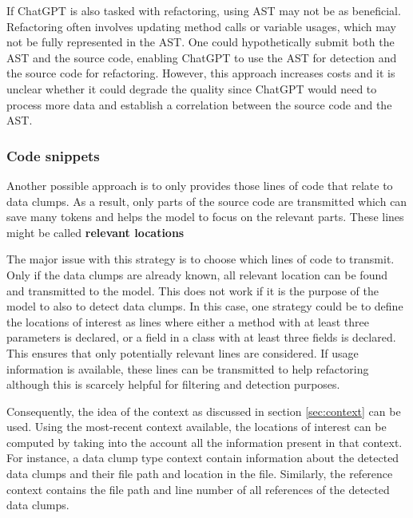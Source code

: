 If ChatGPT is also tasked with refactoring, using \ac{AST} may not be as beneficial. Refactoring often involves updating method calls or variable usages, which may not be fully represented in the \ac{AST}. One could hypothetically submit both the \ac{AST} and the source code, enabling ChatGPT to use the \ac{AST} for detection and the source code for refactoring. However, this approach increases costs and it is unclear whether it could degrade the quality since ChatGPT would need to process more data and establish a correlation between the source code and the \ac{AST}.



\subsubsection{Code snippets}\label{sec:code_snippets}


Another possible approach is to only provides those lines of code that relate to data clumps. As a result, only parts of the source code are transmitted which can save many tokens and helps the model to focus on the relevant parts. These lines might be called \textbf{relevant locations}



The major issue with this strategy is to choose which lines of code to transmit. Only if the data clumps are already known, all relevant location can be found and transmitted to the model. This does not work if it is the purpose of the model to also to detect data clumps. In this case, one strategy could be to define the locations of interest as lines where either a method with at least three parameters is declared, or a field in a class with at least three fields is declared. This ensures that only potentially relevant lines are considered. If usage information is available, these lines can be transmitted to help refactoring although this is scarcely helpful for filtering and detection purposes. 

Consequently, the idea of the context as discussed in section \ref{sec:context} can be used. Using the most-recent context available, the locations of interest can be computed by taking into the account all the information present in that context. For instance, a data clump type context contain information about the detected data clumps and their file path and location in the file. Similarly, the reference context contains the file path and line number of all references of the detected data clumps.



